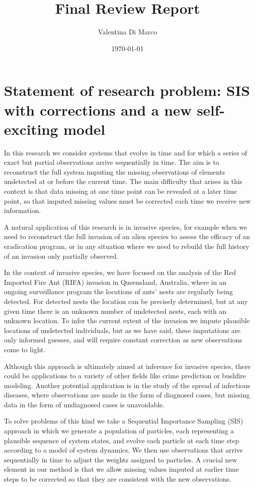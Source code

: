 \documentclass[11pt,a4paper]{article}
\title{Final Review Report}
\author{Valentina Di Marco}
\date{\today}
\begin{document}
\maketitle

\section{Statement of research problem: SIS with corrections and a new self-exciting model}

In this research we consider systems that evolve in time and for which a series of exact but partial observations arrive sequentially in time. The aim is to reconstruct the full system imputing the missing observations of elements undetected at or before the current time. The main difficulty that arises in this context is that data missing at one time point can be revealed at a later time point, so that imputed missing values must be corrected each time we receive new information.

A natural application of this research is in invasive species, for example when we need to reconstruct the full invasion of an alien species to assess the efficacy of an eradication program, or in any situation where we need to rebuild the full history of an invasion only partially observed.

In the context of invasive species, we have focused on the analysis of the Red Imported Fire Ant (RIFA) invasion in Queensland, Australia, where in an ongoing surveillance program the locations of ants’ nests are regularly being detected. For detected nests the location can be precisely determined, but at any given time there is an unknown number of undetected nests, each with an unknown location. To infer the current extent of the invasion we impute plausible locations of undetected individuals, but as we have said, these imputations are only informed guesses, and will require constant correction as new observations come to light.

Although this approach is ultimately aimed at inference for invasive species, there could be applications to a variety of other fields like crime prediction or bushfire modeling. Another potential application is in the study of the spread of infectious diseases, where observations are made in the form of diagnosed cases, but missing data in the form of undiagnosed cases is unavoidable.

To solve problems of this kind we take a Sequential Importance Sampling (SIS) approach in which we generate a population of particles, each representing a plausible sequence of system states, and evolve each particle at each time step according to a model of system dynamics. We then use observations that arrive sequentially in time to adjust the weights assigned to particles. A crucial new element in our method is that we allow missing values imputed at earlier time steps to be corrected so that they are consistent with the new observations.
\end{document}
